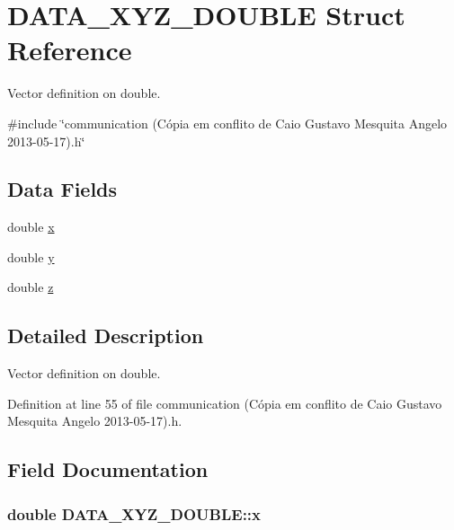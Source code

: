 \hypertarget{structDATA__XYZ__DOUBLE}{\section{D\-A\-T\-A\-\_\-\-X\-Y\-Z\-\_\-\-D\-O\-U\-B\-L\-E Struct Reference}
\label{structDATA__XYZ__DOUBLE}
}


Vector definition on double.  




{\ttfamily \#include \char`\"{}communication (\-Cópia em conflito de Caio Gustavo Mesquita Angelo 2013-\/05-\/17).\-h\char`\"{}}

\subsection*{Data Fields}
\begin{DoxyCompactItemize}
\item 
double \hyperlink{structDATA__XYZ__DOUBLE_a22868cc99a423900e7b82d015a5eb91f}{x}
\item 
double \hyperlink{structDATA__XYZ__DOUBLE_a198a27b5df3b5b0bf461b0e481e22a82}{y}
\item 
double \hyperlink{structDATA__XYZ__DOUBLE_a9556e8868c223ff3e28756ea18a284c0}{z}
\end{DoxyCompactItemize}


\subsection{Detailed Description}
Vector definition on double. 

Definition at line 55 of file communication (\-Cópia em conflito de Caio Gustavo Mesquita Angelo 2013-\/05-\/17).\-h.



\subsection{Field Documentation}
\hypertarget{structDATA__XYZ__DOUBLE_a22868cc99a423900e7b82d015a5eb91f}{
\subsubsection[{x}]{\setlength{\rightskip}{0pt plus 5cm}double D\-A\-T\-A\-\_\-\-X\-Y\-Z\-\_\-\-D\-O\-U\-B\-L\-E\-::x}}\label{structDATA__XYZ__DOUBLE_a22868cc99a423900e7b82d015a5eb91f}


